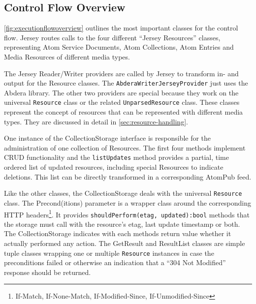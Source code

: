 \documentclass[11pt,a4paper,headsepline,twoside]{scrartcl}		%
\begin{document}
\subsection{Control Flow Overview}
\label{sec:overview}

\autoref{fig:executionflowoverview} outlines the most important classes for the
control flow. Jersey routes calls to the four different ``Jersey Resources''
classes, representing Atom Service Documents, Atom Collections, Atom Entries and
Media Resources of different media types.

The Jersey Reader/Writer providers are called by Jersey to transform in- and
output for the Resource classes. The \lstinline:AbderaWriterJerseyProvider: just
uses the Abdera library. The other two providers are special because they work
on the universal \lstinline:Resource: class or the related
\lstinline:UnparsedResource: class. These classes represent the concept of
resources that can be represented with different media types. They are discussed
in detail in \autoref{sec:resource-handling}.

One instance of the CollectionStorage interface is responsible for the
administration of one collection of Resources. The first four methods implement
CRUD functionality and the \lstinline:listUpdates: method provides a partial,
time ordered list of updated resources, including special Resources to indicate
deletions. This list can be directly transformed in a corresponding AtomPub
feed.

Like the other classes, the CollectionStorage deals with the universal
\lstinline:Resource: class. The Precond(itions) parameter is a wrapper class
around the corresponding HTTP headers\footnote{If-Match, If-None-Match,
  If-Modified-Since, If-Unmodified-Since}. It provides
\lstinline;shouldPerform(etag, updated):bool; methods that the storage must call
with the resource's etag, last update timestamp or both. The CollectionStorage
indicates with each methods return value whether it actually performed any
action. The GetResult and ResultList classes are simple tuple classes wrapping
one or multiple \lstinline:Resource: instances in case the preconditions failed
or otherwise an indication that a ``304 Not Modified'' response should be
returned.
\end{document}
